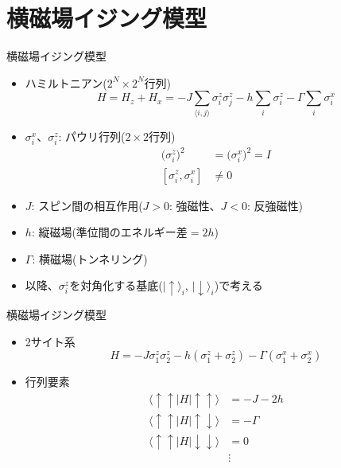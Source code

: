 \section{横磁場イジング模型}

\begin{frame}[t,fragile]{横磁場イジング模型}
  \begin{itemize}
  \item ハミルトニアン($2^N \times 2^N$行列)
    \[
      H = H_z + H_x = - J \sum_{\langle i,j \rangle} \sigma_i^z \sigma_j^z - h \sum_i \sigma_i^z - \Gamma \sum_i \sigma_i^x
    \]
  \item $\sigma_i^x$、$\sigma_i^z$: パウリ行列($2 \times 2$行列)
    \begin{align*}
      \big(\sigma_i^z\big)^2 &= \big(\sigma_i^x\big)^2 = I \\
      [ \sigma_i^z, \sigma_i^x ] &\ne 0
    \end{align*}
  \item $J$: スピン間の相互作用($J>0$: 強磁性、$J<0$: 反強磁性)
  \item $h$: 縦磁場(準位間のエネルギー差$=2h$)
  \item $\Gamma$: 横磁場(トンネリング)
  \item 以降、$\sigma_i^z$を対角化する基底($|\!\uparrow\rangle_i$, $|\!\downarrow\rangle_i$)で考える
  \end{itemize}
\end{frame}

\begin{frame}[t,fragile]{横磁場イジング模型}
  \begin{itemize}
  \item 2サイト系
    \[
      H = -J \sigma_1^z \sigma_2^z - h (\sigma_1^z + \sigma_2^z) - \Gamma (\sigma_1^x + \sigma_2^x)
    \]
  \item 行列要素
    \begin{align*}
      \langle \uparrow \uparrow \!| H |\! \uparrow \uparrow \rangle &= -J - 2h \\
      \langle \uparrow \uparrow \!| H |\! \uparrow \downarrow \rangle &= -\Gamma \\
      \langle \uparrow \uparrow \!| H |\! \downarrow \downarrow \rangle &= 0 \\
      &\vdots
    \end{align*}
  \end{itemize}
\end{frame}

